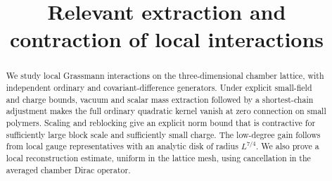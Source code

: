 \documentclass[11pt,letterpaper,reqno]{amsart}
\title[Extraction and contraction of local interactions]
{Relevant extraction and contraction of local interactions}
\date{}
\begin{document}
\begin{abstract}
We study local Grassmann interactions on the three-dimensional
chamber lattice, with independent ordinary and covariant-difference
generators. Under explicit small-field and charge bounds, vacuum
and scalar mass extraction followed by a shortest-chain adjustment
makes the full ordinary quadratic kernel vanish at zero connection
on small polymers.
Scaling and reblocking give an explicit norm bound that is
contractive for sufficiently large block scale and sufficiently
small charge.
The low-degree gain follows from local gauge representatives with
an analytic disk of radius \(L^{7/4}\). We also prove a local
reconstruction estimate, uniform in the lattice mesh, using
cancellation in the averaged chamber Dirac operator.
\end{abstract}
\maketitle
\tableofcontents







\appendix


\printbibliography
\end{document}
